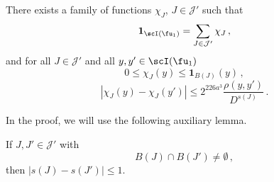     \begin{lemma}
        \label{Lipschitz-partition-unity}
        \leanok
        There exists a family of functions $\chi_J$, $J \in \mathcal{J}'$ such that \begin{equation}
            \label{eq-pao-1}
            \mathbf{1}_{\scI(\fu_1)} = \sum_{J \in \mathcal{J}'} \chi_J\,,
        \end{equation}
        and for all $J \in \mathcal{J}'$ and all $y,y' \in \scI(\fu_1)$
      \begin{equation}
            \label{eq-pao-2}
            0 \leq \chi_J(y) \leq \mathbf{1}_{B(J)}(y)\,,
        \end{equation}
      \begin{equation}
            \label{eq-pao-3}
            |\chi_J(y) - \chi_J(y')| \le 2^{226a^3} \frac{\rho(y,y')}{D^{s(J)}}\,.
        \end{equation}
    \end{lemma}

    In the proof, we will use the following auxiliary lemma.

    \begin{lemma}
        \label{moderate-scale-change}
        \leanok

        If $J, J' \in \mathcal{J'}$ with
        $$
            B(J) \cap B(J') \ne \emptyset\,,
        $$
        then $|s(J) - s(J')| \le 1$.
    \end{lemma}


